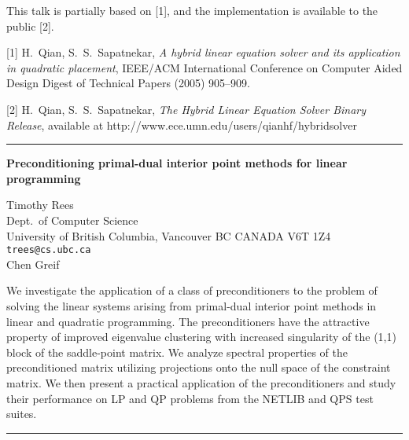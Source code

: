 \documentclass[twosided]{report}
\begin{document}
This talk is partially based on [1], and the
implementation is available to the public [2].

[1]
H.~Qian, S.~S.~Sapatnekar, {\em A hybrid linear equation
solver and its application in quadratic placement},
IEEE/ACM International Conference on Computer Aided
Design Digest of Technical Papers (2005) 905--909.

[2] H.~Qian, S.~S.~Sapatnekar,
{\em The Hybrid Linear Equation Solver Binary Release},
available at http://www.ece.umn.edu/users/qianhf/hybridsolver



	\begin{center} \rule{6in}{1pt} \end{center}

\begin{center}
{\large			%
{\bf Preconditioning primal-dual interior point methods for linear programming}}

	Timothy Rees \\
	Dept.~of Computer Science \\
	University of British Columbia, Vancouver BC CANADA V6T 1Z4 \\
	{\tt trees@cs.ubc.ca} \\
	Chen Greif
\end{center}
We investigate the application of a class of preconditioners
to the problem of solving the linear systems arising from
primal-dual interior point methods in linear and quadratic
programming.  The preconditioners have the attractive
property of improved eigenvalue clustering with increased
singularity of the (1,1) block of the saddle-point matrix.
We analyze spectral properties of the preconditioned matrix
utilizing projections onto the null space of the constraint
matrix.  We then present a practical application of the
preconditioners and study their performance on LP and QP
problems from the NETLIB and QPS test suites.


	\begin{center} \rule{6in}{1pt} \end{center}
\end{document}
